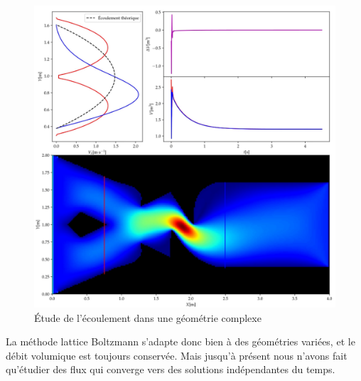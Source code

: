 \begin{figure}[hbtp]
  \centering
  \includegraphics[width=\linewidth]{Fig/CF.png}
  \caption{Étude de l'écoulement dans une géométrie complexe}
  \label{fig:CF}
\end{figure}

La méthode lattice Boltzmann s'adapte donc bien à des géométries variées, et le débit volumique est toujours conservée.
Mais jusqu'à présent nous n'avons fait qu'étudier des flux qui converge vers des solutions indépendantes du temps.
